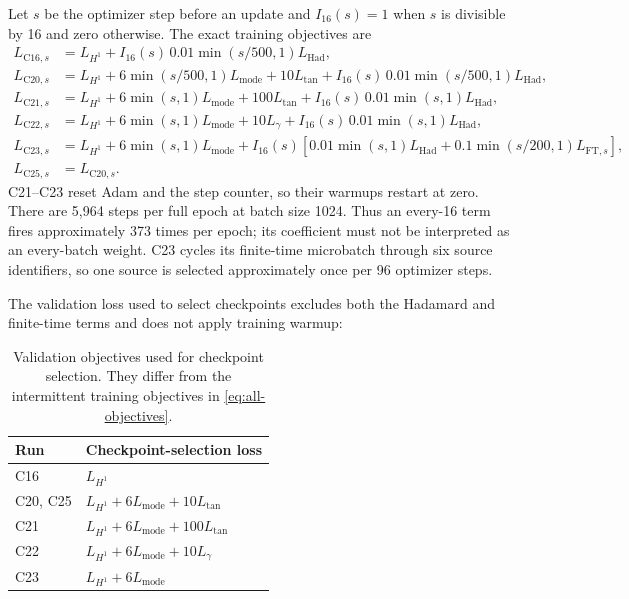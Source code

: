\documentclass[11pt]{article}
\begin{document}
Let $s$ be the optimizer step before an update and
$I_{16}(s)=1$ when $s$ is divisible by 16 and zero otherwise.  The exact
training objectives are
\begin{align}
 L_{\mathrm{C16},s}
 &=L_{H^1}+I_{16}(s)\,0.01\min(s/500,1)L_{\mathrm{Had}},\\
 L_{\mathrm{C20},s}
 &=L_{H^1}+6\min(s/500,1)L_{\mathrm{mode}}+10L_{\mathrm{tan}}
 +I_{16}(s)\,0.01\min(s/500,1)L_{\mathrm{Had}},\\
 L_{\mathrm{C21},s}
 &=L_{H^1}+6\min(s,1)L_{\mathrm{mode}}+100L_{\mathrm{tan}}
 +I_{16}(s)\,0.01\min(s,1)L_{\mathrm{Had}},\\
 L_{\mathrm{C22},s}
 &=L_{H^1}+6\min(s,1)L_{\mathrm{mode}}+10L_{\gamma}
 +I_{16}(s)\,0.01\min(s,1)L_{\mathrm{Had}},\\
 L_{\mathrm{C23},s}
 &=L_{H^1}+6\min(s,1)L_{\mathrm{mode}}
 +I_{16}(s)\left[0.01\min(s,1)L_{\mathrm{Had}}
 +0.1\min(s/200,1)L_{\mathrm{FT},s}\right],\\
 L_{\mathrm{C25},s}&=L_{\mathrm{C20},s}.
 \label{eq:all-objectives}
\end{align}
C21--C23 reset Adam and the step counter, so their warmups restart at zero.
There are 5,964 steps per full epoch at batch size 1024.  Thus an every-16
term fires approximately 373 times per epoch; its coefficient must not be
interpreted as an every-batch weight.  C23 cycles its finite-time microbatch
through six source identifiers, so one source is selected approximately once
per 96 optimizer steps.

The validation loss used to select checkpoints excludes both the Hadamard and
finite-time terms and does not apply training warmup:
\begin{table}[htbp]
\centering
\begin{tabular}{ll}
\toprule
Run & Checkpoint-selection loss \\
\midrule
C16 & $L_{H^1}$ \\
C20, C25 & $L_{H^1}+6L_{\mathrm{mode}}+10L_{\mathrm{tan}}$ \\
C21 & $L_{H^1}+6L_{\mathrm{mode}}+100L_{\mathrm{tan}}$ \\
C22 & $L_{H^1}+6L_{\mathrm{mode}}+10L_\gamma$ \\
C23 & $L_{H^1}+6L_{\mathrm{mode}}$ \\
\bottomrule
\end{tabular}
\caption{Validation objectives used for checkpoint selection.  They differ
from the intermittent training objectives in \eqref{eq:all-objectives}.}
\label{tab:val-losses}
\end{table}
\end{document}

